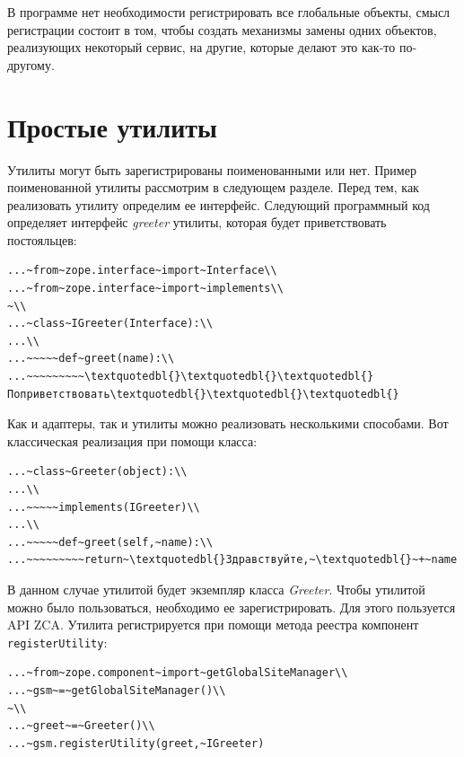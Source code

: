 \documentclass[a4paper,openany,twoside,draft]{book}
\providecommand*{\DUroletitlereference}[1]{\textsl{#1}}
\begin{document}
В программе нет необходимости регистрировать все глобальные объекты,
смысл регистрации состоит в том, чтобы создать механизмы замены одних
объектов, реализующих некоторый сервис, на другие, которые делают это
как-то по-другому.


\section{Простые утилиты%
  \label{id41}%
}

Утилиты могут быть зарегистрированы поименованными или нет.  Пример
поименованной утилиты рассмотрим в следующем разделе.  Перед тем, как
реализовать утилиту определим ее интерфейс.  Следующий программный код
определяет интерфейс \DUroletitlereference{greeter} утилиты, которая будет приветствовать
постояльцев:

\begin{verbatim}
...~from~zope.interface~import~Interface\\
...~from~zope.interface~import~implements\\
~\\
...~class~IGreeter(Interface):\\
...\\
...~~~~~def~greet(name):\\
...~~~~~~~~~\textquotedbl{}\textquotedbl{}\textquotedbl{}Поприветствовать\textquotedbl{}\textquotedbl{}\textquotedbl{}
\end{verbatim}

Как и адаптеры, так и утилиты можно реализовать несколькими
способами.  Вот классическая реализация при помощи класса:

\begin{verbatim}
...~class~Greeter(object):\\
...\\
...~~~~~implements(IGreeter)\\
...\\
...~~~~~def~greet(self,~name):\\
...~~~~~~~~~return~\textquotedbl{}Здравствуйте,~\textquotedbl{}~+~name
\end{verbatim}

В данном случае утилитой будет экземпляр класса \DUroletitlereference{Greeter}.  Чтобы
утилитой можно было пользоваться, необходимо ее зарегистрировать.  Для
этого пользуется API ZCA.  Утилита регистрируется при помощи метода
реестра компонент \texttt{registerUtility}:

\begin{verbatim}
...~from~zope.component~import~getGlobalSiteManager\\
...~gsm~=~getGlobalSiteManager()\\
~\\
...~greet~=~Greeter()\\
...~gsm.registerUtility(greet,~IGreeter)
\end{verbatim}
\end{document}
